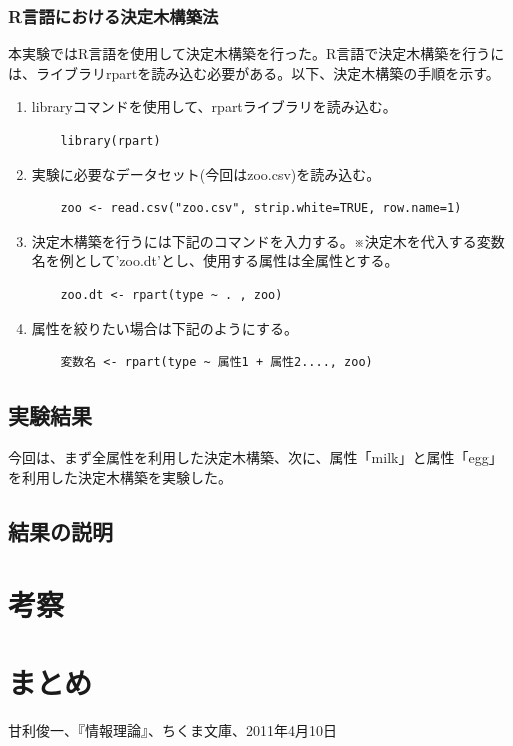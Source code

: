 \documentclass[dvipdfmx]{jsarticle}
\begin{document}
\subsubsection{R言語における決定木構築法}
本実験ではR言語を使用して決定木構築を行った。R言語で決定木構築を行うには、ライブラリrpartを読み込む必要がある。以下、決定木構築の手順を示す。
\begin{enumerate}
  \item libraryコマンドを使用して、rpartライブラリを読み込む。
  \begin{verbatim}
    library(rpart)
  \end{verbatim}
  \item 実験に必要なデータセット(今回はzoo.csv)を読み込む。
  \begin{verbatim}
    zoo <- read.csv("zoo.csv", strip.white=TRUE, row.name=1)
  \end{verbatim}
  \item 決定木構築を行うには下記のコマンドを入力する。※決定木を代入する変数名を例として’zoo.dt’とし、使用する属性は全属性とする。
  \begin{verbatim}
    zoo.dt <- rpart(type ~ . , zoo)
  \end{verbatim}
  \item 属性を絞りたい場合は下記のようにする。
  \begin{verbatim}
    変数名 <- rpart(type ~ 属性1 + 属性2...., zoo)
  \end{verbatim}
\end{enumerate}
\subsection{実験結果}
今回は、まず全属性を利用した決定木構築、次に、属性「milk」と属性「egg」を利用した決定木構築を実験した。
\subsection{結果の説明}
\section{考察}
\section{まとめ}
\begin{thebibliography}{99}
   甘利俊一、『情報理論』、ちくま文庫、2011年4月10日
\end{thebibliography}
\end{document}
